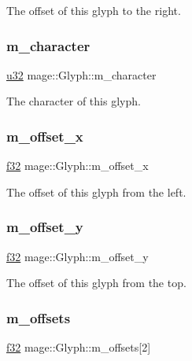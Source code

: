 The offset of this glyph to the right. \hypertarget{structmage_1_1_glyph_a69ce57c13d8a73174a0d88fd03b35fda}{}\label{structmage_1_1_glyph_a69ce57c13d8a73174a0d88fd03b35fda} 
\subsubsection{\texorpdfstring{m\+\_\+character}{m\_character}}
{\footnotesize\ttfamily \hyperlink{namespacemage_af2b398bf98eb10351f49cad73fe2cc73}{u32} mage\+::\+Glyph\+::m\+\_\+character}

The character of this glyph. \hypertarget{structmage_1_1_glyph_ae983fa77eaf0947aaffac8aa11b74518}{}\label{structmage_1_1_glyph_ae983fa77eaf0947aaffac8aa11b74518} 
\subsubsection{\texorpdfstring{m\+\_\+offset\+\_\+x}{m\_offset\_x}}
{\footnotesize\ttfamily \hyperlink{namespacemage_a6a44ad388483959dc4dff9f2aef91431}{f32} mage\+::\+Glyph\+::m\+\_\+offset\+\_\+x}

The offset of this glyph from the left. \hypertarget{structmage_1_1_glyph_a86456531180ba716cd806e3f601e7aee}{}\label{structmage_1_1_glyph_a86456531180ba716cd806e3f601e7aee} 
\subsubsection{\texorpdfstring{m\+\_\+offset\+\_\+y}{m\_offset\_y}}
{\footnotesize\ttfamily \hyperlink{namespacemage_a6a44ad388483959dc4dff9f2aef91431}{f32} mage\+::\+Glyph\+::m\+\_\+offset\+\_\+y}

The offset of this glyph from the top. \hypertarget{structmage_1_1_glyph_a378fa43d46f11b5963cad0500288494a}{}\label{structmage_1_1_glyph_a378fa43d46f11b5963cad0500288494a} 
\subsubsection{\texorpdfstring{m\+\_\+offsets}{m\_offsets}}
{\footnotesize\ttfamily \hyperlink{namespacemage_a6a44ad388483959dc4dff9f2aef91431}{f32} mage\+::\+Glyph\+::m\+\_\+offsets\mbox{[}2\mbox{]}}

